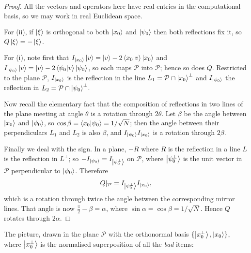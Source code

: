 \documentclass[a4paper]{scrartcl}
\newcommand{\Ps}{\mathcal{P}}
\begin{document}
\begin{proof}
	All the vectors and operators here have real entries in the computational basis, so we may work in real Euclidean space.

	For (ii), if $\ket\xi$ is orthogonal to both $\ket{x_0}$ and $\ket{\psi_0}$ then both reflections fix it, so $Q\ket\xi = -\ket\xi$.

	For (i), note first that $I_{\ket{x_0}}\ket v = \ket v - 2\ip{x_0}{v}\ket{x_0}$ and $I_{\ket{\psi_0}}\ket v = \ket v - 2\ip{\psi_0}{v}\ket{\psi_0}$, so each maps $\Ps$ into $\Ps$; hence so does $Q$. Restricted to the plane $\Ps$, $I_{\ket{x_0}}$ is the reflection in the line $L_1 = \Ps\cap\ket{x_0}^\perp$ and $I_{\ket{\psi_0}}$ the reflection in $L_2 = \Ps\cap\ket{\psi_0}^\perp$.

	Now recall the elementary fact that the composition of reflections in two lines of the plane meeting at angle $\theta$ is a rotation through $2\theta$. Let $\beta$ be the angle between $\ket{x_0}$ and $\ket{\psi_0}$, so $\cos\beta = \ip{x_0}{\psi_0} = 1/\sqrt N$; then the angle between their perpendiculars $L_1$ and $L_2$ is also $\beta$, and $I_{\ket{\psi_0}}I_{\ket{x_0}}$ is a rotation through $2\beta$.

	Finally we deal with the sign. In a plane, $-R$ where $R$ is the reflection in a line $L$ is the reflection in $L^\perp$; so $-I_{\ket{\psi_0}} = I_{\ket{\psi_0^\perp}}$ on $\Ps$, where $\ket{\psi_0^\perp}$ is the unit vector in $\Ps$ perpendicular to $\ket{\psi_0}$. Therefore
	$$Q|_\Ps = I_{\ket{\psi_0^\perp}}I_{\ket{x_0}},$$
	which is a rotation through twice the angle between the corresponding mirror lines. That angle is now $\tfrac\pi2-\beta = \alpha$, where $\sin\alpha = \cos\beta = 1/\sqrt N$. Hence $Q$ rotates through $2\alpha$.
\end{proof}

The picture, drawn in the plane $\Ps$ with the orthonormal basis $\{\ket{x_0^\perp},\ket{x_0}\}$, where $\ket{x_0^\perp}$ is the normalised superposition of all the \emph{bad} items:
\end{document}
